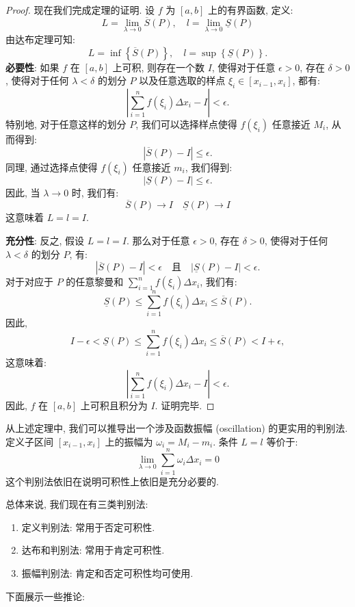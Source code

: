 \documentclass[a4paper,12pt]{ctexart}
\begin{document}
\begin{proof}
现在我们完成定理的证明. 设 $f$ 为 $[a,b]$ 上的有界函数, 定义: 
$$
L = \lim_{\lambda \to 0} \overline{S}(P), \quad l = \lim_{\lambda \to 0} \underline{S}(P)
$$
由达布定理可知: 
$$
L = \inf \left\{ \overline{S}(P) \right\}, \quad l = \sup \left\{ \underline{S}(P) \right\}.
$$
\textbf{必要性}: 如果 $f$ 在 $[a,b]$ 上可积, 则存在一个数 $I$, 使得对于任意 $\epsilon > 0$, 存在 $\delta > 0$, 使得对于任何 $\lambda < \delta$ 的划分 $P$ 以及任意选取的样点 $\xi_i \in [x_{i-1}, x_i]$, 都有: 
$$
\left| \sum_{i=1}^{n} f(\xi_i) \Delta x_i - I \right| < \epsilon.
$$
特别地, 对于任意这样的划分 $P$, 我们可以选择样点使得 $f(\xi_i)$ 任意接近 $M_i$, 从而得到: 
$$
\left| \overline{S}(P) - I \right| \leq \epsilon.
$$
同理, 通过选择点使得 $f(\xi_i)$ 任意接近 $m_i$, 我们得到: 
$$
\left| \underline{S}(P) - I \right| \leq \epsilon.
$$
因此, 当 $\lambda \to 0$ 时, 我们有: 
$$
\overline{S}(P) \to I \quad \underline{S}(P) \to I
$$
这意味着 $L = l = I$.

\textbf{充分性}: 反之, 假设 $L = l = I$. 那么对于任意 $\epsilon > 0$, 存在 $\delta > 0$, 使得对于任何 $\lambda < \delta$ 的划分 $P$, 有: 
$$
\left| \overline{S}(P) - I \right| < \epsilon \quad \text{且} \quad \left| \underline{S}(P) - I \right| < \epsilon.
$$
对于对应于 $P$ 的任意黎曼和 $\sum_{i=1}^{n} f(\xi_i) \Delta x_i$, 我们有: 
$$
\underline{S}(P) \leq \sum_{i=1}^{n} f(\xi_i) \Delta x_i \leq \overline{S}(P).
$$
因此, 
$$
I - \epsilon < \underline{S}(P) \leq \sum_{i=1}^{n} f(\xi_i) \Delta x_i \leq \overline{S}(P) < I + \epsilon,
$$
这意味着: 
$$
\left| \sum_{i=1}^{n} f(\xi_i) \Delta x_i - I \right| < \epsilon.
$$
因此, $f$ 在 $[a,b]$ 上可积且积分为 $I$. 证明完毕.
\end{proof}

从上述定理中, 我们可以推导出一个涉及函数振幅 (oscillation) 的更实用的判别法. 定义子区间 $[x_{i-1}, x_i]$ 上的振幅为 $\omega_i = M_i - m_i$. 条件 $L=l$ 等价于: 
$$
\lim_{\lambda \to 0} \sum_{i=1}^n \omega_i \Delta x_i = 0
$$
这个判别法依旧在说明可积性上依旧是充分必要的.

总体来说, 我们现在有三类判别法:
\begin{enumerate}
    \item 定义判别法: 常用于否定可积性.
    \item 达布和判别法: 常用于肯定可积性.
    \item 振幅判别法: 肯定和否定可积性均可使用.
\end{enumerate}

下面展示一些推论:
\end{document}
